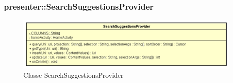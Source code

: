 \documentclass[../DefinizioneDiProdotto.tex]{subfiles}
\begin{document}
\subsubsection{presenter::SearchSuggestionsProvider}

    \begin{figure}[H]
        \centering
        \includegraphics{img/SearchSuggestionsProvider.png}
        \caption{Classe SearchSuggestionsProvider}\label{fig:presenter::SearchSuggestionsProvider} 
    \end{figure}
\end{document}
